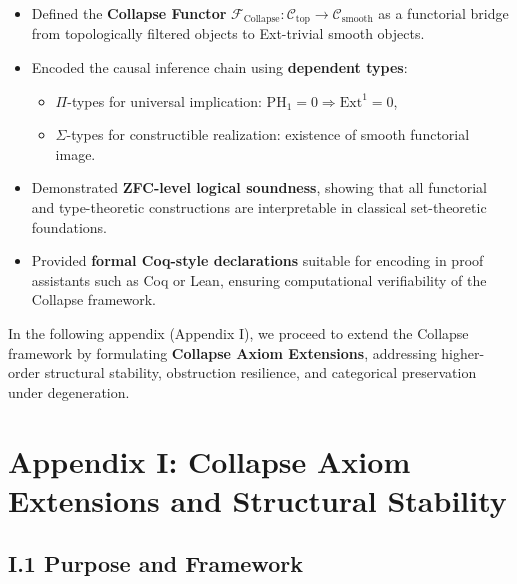 \documentclass[11pt]{article}
\begin{document}
\begin{itemize}
  \item Defined the \textbf{Collapse Functor} $\mathcal{F}_{\mathrm{Collapse}} : \mathcal{C}_{\mathrm{top}} \to \mathcal{C}_{\mathrm{smooth}}$ as a functorial bridge from topologically filtered objects to Ext-trivial smooth objects.
  
  \item Encoded the causal inference chain using \textbf{dependent types}:
  \begin{itemize}
    \item $\Pi$-types for universal implication: $\mathrm{PH}_1 = 0 \Rightarrow \mathrm{Ext}^1 = 0$,
    \item $\Sigma$-types for constructible realization: existence of smooth functorial image.
  \end{itemize}
  
  \item Demonstrated \textbf{ZFC-level logical soundness}, showing that all functorial and type-theoretic constructions are interpretable in classical set-theoretic foundations.

  \item Provided \textbf{formal Coq-style declarations} suitable for encoding in proof assistants such as Coq or Lean, ensuring computational verifiability of the Collapse framework.
\end{itemize}

\vspace{1em}
In the following appendix (Appendix I), we proceed to extend the Collapse framework by formulating \textbf{Collapse Axiom Extensions}, addressing higher-order structural stability, obstruction resilience, and categorical preservation under degeneration.




\section*{Appendix I: Collapse Axiom Extensions and Structural Stability}

\subsection*{I.1 Purpose and Framework}
\end{document}
